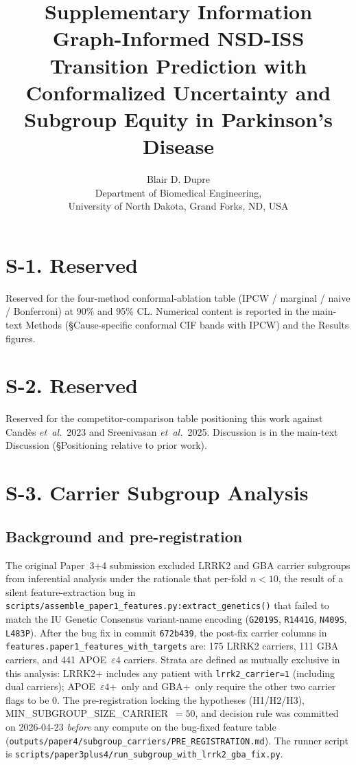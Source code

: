 \documentclass[11pt]{article}
\title{Supplementary Information \\[0.5em]
Graph-Informed NSD-ISS Transition Prediction with \\
Conformalized Uncertainty and Subgroup Equity in Parkinson's Disease}
\author{Blair D. Dupre\\[0.5em]
Department of Biomedical Engineering,\\
University of North Dakota, Grand Forks, ND, USA}
\date{}
\begin{document}
\maketitle

\section*{S-1. Reserved}
\label{sec:s1}

Reserved for the four-method conformal-ablation table (IPCW / marginal / naive / Bonferroni) at 90\% and 95\% CL. Numerical content is reported in the main-text Methods (\S Cause-specific conformal CIF bands with IPCW) and the Results figures.

\section*{S-2. Reserved}
\label{sec:s2}

Reserved for the competitor-comparison table positioning this work against Cand\`{e}s \textit{et~al.}~2023 and Sreenivasan \textit{et~al.}~2025. Discussion is in the main-text Discussion (\S Positioning relative to prior work).

\section*{S-3. Carrier Subgroup Analysis}
\label{sec:s3}

\subsection*{Background and pre-registration}

The original Paper~3+4 submission excluded LRRK2 and GBA carrier subgroups from inferential analysis under the rationale that per-fold $n<10$, the result of a silent feature-extraction bug in \texttt{scripts/assemble\_paper1\_features.py:extract\_genetics()} that failed to match the IU Genetic Consensus variant-name encoding (\texttt{G2019S}, \texttt{R1441G}, \texttt{N409S}, \texttt{L483P}). After the bug fix in commit \texttt{672b439}, the post-fix carrier columns in \texttt{features.paper1\_features\_with\_targets} are: 175 LRRK2 carriers, 111 GBA carriers, and 441 APOE~$\varepsilon4$ carriers. Strata are defined as mutually exclusive in this analysis: LRRK2+ includes any patient with \texttt{lrrk2\_carrier=1} (including dual carriers); APOE~$\varepsilon4$+~only and GBA+~only require the other two carrier flags to be 0. The pre-registration locking the hypotheses (H1/H2/H3), MIN\_SUBGROUP\_SIZE\_CARRIER~$=50$, and decision rule was committed on 2026-04-23 \emph{before} any compute on the bug-fixed feature table (\texttt{outputs/paper4/subgroup\_carriers/PRE\_REGISTRATION.md}). The runner script is \texttt{scripts/paper3plus4/run\_subgroup\_with\_lrrk2\_gba\_fix.py}.
\end{document}
